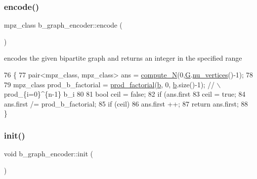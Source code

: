 \mbox{\label{classb__graph__encoder_ab238f7cf40295274caf554eef6347e74}} 
\subsubsection{\texorpdfstring{encode()}{encode()}}
{\footnotesize\ttfamily mpz\+\_\+class b\+\_\+graph\+\_\+encoder\+::encode (\begin{DoxyParamCaption}{ }\end{DoxyParamCaption})}



encodes the given bipartite graph and returns an integer in the specified range 


\begin{DoxyCode}
76 \{
77   pair<mpz\_class, mpz\_class> ans = \hyperlink{classb__graph__encoder_a58e4aae68aab6cd8e4d34fc6b658c380}{compute\_N}(0,\hyperlink{classb__graph__encoder_af969e24f445db0e54513086604e2c165}{G}.\hyperlink{classb__graph_a69ff77c254af827afbfe52934b6736a5}{nu\_vertices}()-1);
78 
79   mpz\_class prod\_b\_factorial = \hyperlink{compression__helper_8cpp_a86d8a20e022dc06b23df3b08ac10b7d1}{prod\_factorial}(\hyperlink{classb__graph__encoder_a767826e268702e45ab71565e096a52b8}{b}, 0, \hyperlink{classb__graph__encoder_a767826e268702e45ab71565e096a52b8}{b}.size()-1); \textcolor{comment}{// \(\backslash\)prod\_\{i=0\}^\{n-1\} b\_i}
80 
81   \textcolor{keywordtype}{bool} ceil = \textcolor{keyword}{false};
82   \textcolor{keywordflow}{if} (ans.first %
83     ceil = \textcolor{keyword}{true};
84   ans.first /= prod\_b\_factorial;
85   \textcolor{keywordflow}{if} (ceil)
86     ans.first ++;
87   \textcolor{keywordflow}{return} ans.first;
88 \}
\end{DoxyCode}
\mbox{\label{classb__graph__encoder_a844cff8771a706d4de2abeec1312ff04}} 
\subsubsection{\texorpdfstring{init()}{init()}}
{\footnotesize\ttfamily void b\+\_\+graph\+\_\+encoder\+::init (\begin{DoxyParamCaption}{ }\end{DoxyParamCaption})}




